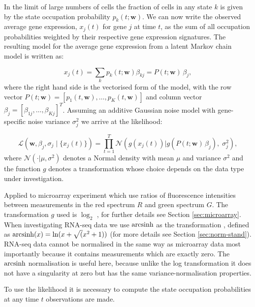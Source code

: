 In the limit of large numbers of cells the fraction of cells in any state $k$ is given by the state occupation probability $p_k(t;\mathbf{w})$. We can now write the observed average gene expression, $x_j(t)$ for gene $j$ at time $t$, as the sum of all occupation probabilities weighted by their respective gene expression signatures. The resulting model for the average gene expression from a latent Markov chain model is written as:

\begin{equation}
  x_j(t) = \sum_k p_k(t;\mathbf{w})\beta_{kj} = P(t;\mathbf{w}) \, \beta_j,
  \label{eq:model}
\end{equation}
where the right hand side is the vectorised form of the model, with the row vector $P(t;\mathbf{w}) = [p_1(t,\mathbf{w}), \ldots , p_K(t,\mathbf{w})]$ and column vector $\beta_j = [\beta_{1j}, \ldots , \beta_{Kj}]^T$. Assuming an additive Gaussian noise model with gene-specific noise variance $\sigma_j^2 $ we arrive at the likelihood:

\begin{equation}
  \label{eq:likelihood}
    \mathcal{L} \left(\mathbf{w}, \beta_j, \sigma_j \;|\; \lbrace x_j(t)\rbrace\right) = 
\prod_{t=1}^T \mathcal{N}\left(g(x_j(t)) | g\left(P(t; \mathbf{w})\,\beta_j\right),\; \sigma_j^2 \right),
\end{equation}
where $\mathcal{N}(\cdot | \mu,\sigma^2)$ denotes a Normal density with mean $\mu$ and variance $\sigma^2$ and the function $g$ denotes a transformation whose choice depends on the data type under investigation.

Applied to microarray experiment which use ratios of fluorescence intensities between measurements in the red spectrum $R$ and green spectrum $G$. The transformation $g$ used is $\log_2$ \citep{Dudoit:2002va}, for further details see Section \ref{sec:microarray}. When investigating RNA-seq data we use $\operatorname{arcsinh}$ as the transformation \citep{Hoffman:2012gn,Johnson:1949uq}, defined as $\operatorname{arcsinh}(x) = \ln(x + \sqrt(x^2 +1))$ (for more details see Section \ref{sec:norm-stand}). RNA-seq data cannot be normalised in the same way as microarray data most importantly because it contains measurements which are exactly zero. The $\operatorname{arcsinh}$ normalisation is useful here, because unlike the log transformation it does not have a singularity at zero but has the same variance-normalisation properties.

To use the likelihood it is necessary to compute the state occupation probabilities at any time $t$ observations are made.

